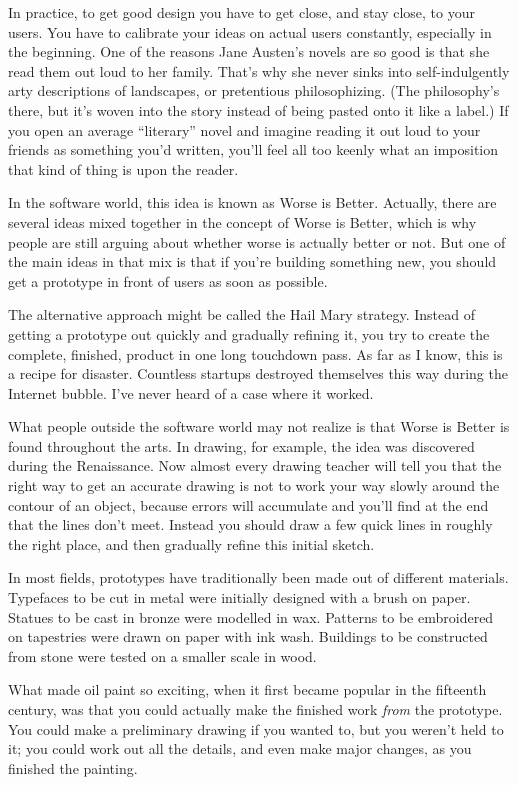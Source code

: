 \documentclass[12pt]{book}
\begin{document}
In practice, to get good design you have to get close, and stay close,
to your users. You have to calibrate your ideas on actual users
constantly, especially in the beginning. One of the reasons Jane
Austen's novels are so good is that she read them out loud to her
family. That's why she never sinks into self-indulgently arty
descriptions of landscapes, or pretentious philosophizing. (The
philosophy's there, but it's woven into the story instead of being
pasted onto it like a label.) If you open an average ``literary'' novel
and imagine reading it out loud to your friends as something you'd
written, you'll feel all too keenly what an imposition that kind of
thing is upon the reader.

In the software world, this idea is known as Worse is Better. Actually,
there are several ideas mixed together in the concept of Worse is
Better, which is why people are still arguing about whether worse is
actually better or not. But one of the main ideas in that mix is that if
you're building something new, you should get a prototype in front of
users as soon as possible.

The alternative approach might be called the Hail Mary strategy. Instead
of getting a prototype out quickly and gradually refining it, you try to
create the complete, finished, product in one long touchdown pass. As
far as I know, this is a recipe for disaster. Countless startups
destroyed themselves this way during the Internet bubble. I've never
heard of a case where it worked.

What people outside the software world may not realize is that Worse is
Better is found throughout the arts. In drawing, for example, the idea
was discovered during the Renaissance. Now almost every drawing teacher
will tell you that the right way to get an accurate drawing is not to
work your way slowly around the contour of an object, because errors
will accumulate and you'll find at the end that the lines don't meet.
Instead you should draw a few quick lines in roughly the right place,
and then gradually refine this initial sketch.

In most fields, prototypes have traditionally been made out of different
materials. Typefaces to be cut in metal were initially designed with a
brush on paper. Statues to be cast in bronze were modelled in wax.
Patterns to be embroidered on tapestries were drawn on paper with ink
wash. Buildings to be constructed from stone were tested on a smaller
scale in wood.

What made oil paint so exciting, when it first became popular in the
fifteenth century, was that you could actually make the finished work
\emph{from} the prototype. You could make a preliminary drawing if you
wanted to, but you weren't held to it; you could work out all the
details, and even make major changes, as you finished the painting.
\end{document}
